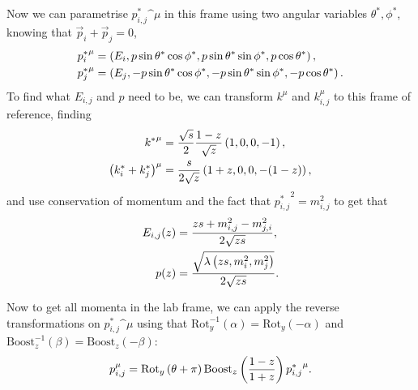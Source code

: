 \documentclass[../main.tex]{subfiles}
\begin{document}
            Now we can parametrise \({p_{i,j}^\ast}\^\mu\) in this frame using two angular variables \(\theta^\ast, \phi^\ast\), knowing that \(\vec{p}_i + \vec{p}_j = 0\),
            \begin{subequations}
                \begin{align}
                    {p_i^\ast}\^\mu & = \pclosed{E_i, p\sin\theta^\ast \cos\phi^\ast, p\sin\theta^\ast \sin\phi^\ast, p \cos\theta^\ast},    \\
                    {p_j^\ast}\^\mu & = \pclosed{E_j, -p\sin\theta^\ast \cos\phi^\ast, -p\sin\theta^\ast \sin\phi^\ast, -p \cos\theta^\ast}.
                \end{align}
            \end{subequations}
            To find what \(E_{i,j}\) and \(p\) need to be, we can transform \(k^\mu\) and \(k_{i,j}^\mu\) to this frame of reference, finding
            \begin{subequations}
                \begin{align}
                    {k^\ast}\^\mu                      & = \frac{\sqrt{s}}{2} \frac{1-z}{\sqrt{z}} \pclosed{1, 0, 0, -1}, \\
                    \pclosed{k_i^\ast + k_j^\ast}\^\mu & = \frac{s}{2\sqrt{z}} \pclosed{1+z, 0, 0, -(1-z)},
                \end{align}
            \end{subequations}
            and use conservation of momentum and the fact that \({p_{i,j}^\ast}^2 = m^2_{i,j}\) to get that
            \begin{subequations}
                \begin{align}
                    E_{i,j}(z) & = \frac{zs + m^2_{i,j} - m^2_{j,i}}{2 \sqrt{zs}},               \\
                    p(z)       & = \frac{\sqrt{\lambda\left(zs, m^2_i, m^2_j\right)}}{2 \sqrt{zs}}.
                \end{align}
            \end{subequations}

            Now to get all momenta in the lab frame, we can apply the reverse transformations on \({p_{i,j}^\ast}\^\mu\) using that \(\text{Rot}^{-1}_y(\alpha) = \text{Rot}_y(-\alpha)\) and \(\text{Boost}_z^{-1}(\beta) = \text{Boost}_z(-\beta)\):
            \begin{equation}
                p_{i,j}^\mu = \text{Rot}_y\pclosed{\theta+\pi} \text{Boost}_z\pclosed{\frac{1-z}{1+z}} {p_{i,j}^\ast}\^\mu.
            \end{equation}
\end{document}
